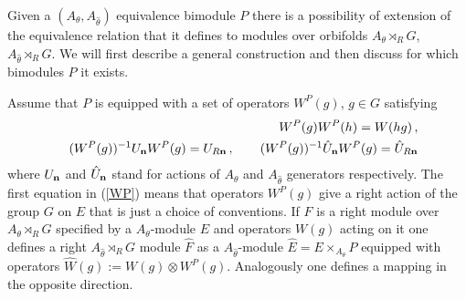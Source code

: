 \documentclass[a4paper,a4paper]{article}
\begin{document}
{Given a  $(A_{\theta},A_{\hat \theta})$ equivalence bimodule $P$ there is a possibility of extension of  the equivalence relation 
that it defines to 
modules over orbifolds $A_{\theta}\rtimes_{R}G$, $A_{\hat \theta}\rtimes_{R}G$. 
We will first describe a general construction and then discuss for which bimodules $P$ it exists.  


 Assume that $P$ is equipped with a set of operators $W^{P}(g)$, $g\in G$ satisfying 
\begin{eqnarray} \label{WP}
&&W^{P}(g)W^{P}(h) = W(hg) \, , \nonumber \\
&& (W^{P}(g))^{-1}U_{\bf n} W^{P}(g) = U_{R{\bf n}} \, , \qquad    (W^{P}(g))^{-1}\hat U_{\bf n} W^{P}(g) = \hat U_{R{\bf n}}
\end{eqnarray}  
where $U_{\bf n}$ and $\hat U_{\bf n}$ stand for actions of $A_{\theta}$ and  $A_{\hat \theta}$ generators respectively. 
The first equation in (\ref{WP}) means that operators $W^{P}(g)$ give a right action of the group $G$ on $E$ that is 
just a choice of conventions. If $F$ is a right module over  $A_{\theta}\rtimes_{R}G$ specified by a $A_{\theta}$-module 
$E$ and  operators $W(g)$ acting on it one defines a  right $A_{\hat \theta}\rtimes_{R}G$ module $\hat F$ as 
a $A_{\hat \theta}$-module $\hat E = E\times_{A_{\theta}} P$ equipped with operators $\hat W(g) :=W(g)\otimes W^{P}(g)$. 
Analogously one defines a mapping in the opposite direction. 


}
\end{document}

